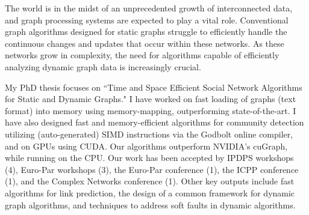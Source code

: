 The world is in the midst of an unprecedented growth of interconnected data, and graph processing systems are expected to play a vital role. Conventional graph algorithms designed for static graphs struggle to efficiently handle the continuous changes and updates that occur within these networks. As these networks grow in complexity, the need for algorithms capable of efficiently analyzing dynamic graph data is increasingly crucial.

My PhD thesis focuses on ``Time and Space Efficient Social Network Algorithms for Static and Dynamic Graphs." I have worked on fast loading of graphs (text format) into memory using memory-mapping, outperforming state-of-the-art. I have also designed fast and memory-efficient algorithms for community detection utilizing (auto-generated) SIMD instructions via the Godbolt online compiler, and on GPUs using CUDA. Our algorithms outperform NVIDIA's cuGraph, while running on the CPU. Our work has been accepted by IPDPS workshops (4), Euro-Par workshops (3), the Euro-Par conference (1), the ICPP conference (1), and the Complex Networks conference (1). Other key outputs include fast algorithms for link prediction, the design of a common framework for dynamic graph algorithms, and techniques to address soft faults in dynamic algorithms.
